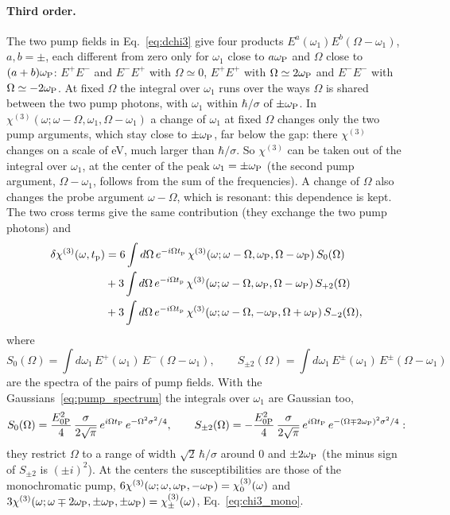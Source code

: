 \documentclass[10pt,a4paper]{paper}
\begin{document}
\paragraph{Third order.} The two pump fields in Eq.~\eqref{eq:dchi3} give four products
$E^a(\omega_1)E^b(\Omega-\omega_1)$, $a,b = \pm$, each different from zero only for $\omega_1$ close to $a\omega_{\mathrm{P}}$ and
$\Omega$ close to $(a+b)\omega_{\mathrm{P}}$: $E^+E^-$ and $E^-E^+$ with $\Omega\simeq0$, $E^+E^+$ with $\Omega\simeq2\omega_{\mathrm{P}}$ and $E^-E^-$
with $\Omega\simeq-2\omega_{\mathrm{P}}$. At fixed $\Omega$ the integral over $\omega_1$ runs over the ways $\Omega$ is shared between
the two pump photons, with $\omega_1$ within $\hbar/\sigma$ of $\pm\omega_{\mathrm{P}}$. In $\chi^{(3)}(\omega;\omega-\Omega,\omega_1,
\Omega-\omega_1)$ a change of $\omega_1$ at fixed $\Omega$ changes only the two pump arguments, which stay close to
$\pm\omega_{\mathrm{P}}$, far below the gap: there $\chi^{(3)}$ changes on a scale of eV, much larger than $\hbar/\sigma$. So $\chi^{(3)}$
can be taken out of the integral over $\omega_1$, at the center of the peak $\omega_1 = \pm\omega_{\mathrm{P}}$ (the second pump
argument, $\Omega-\omega_1$, follows from the sum of the frequencies). A change of $\Omega$ also changes the probe
argument $\omega-\Omega$, which is resonant: this dependence is kept. The two cross terms give the same contribution
(they exchange the two pump photons) and
\begin{align}
\delta\chi^{(3)}(\omega,t_{\mathrm{p}}) &= 6\int d\Omega\,e^{-i\Omega t_{\mathrm{p}}}\,\chi^{(3)}(\omega;\omega-\Omega,\omega_{\mathrm{P}},\Omega-\omega_{\mathrm{P}})\,S_0(\Omega)
\nonumber\\
&+ 3\int d\Omega\,e^{-i\Omega t_{\mathrm{p}}}\,\chi^{(3)}(\omega;\omega-\Omega,\omega_{\mathrm{P}},\Omega-\omega_{\mathrm{P}})\,S_{+2}(\Omega) \nonumber\\
&+ 3\int d\Omega\,e^{-i\Omega t_{\mathrm{p}}}\,\chi^{(3)}(\omega;\omega-\Omega,-\omega_{\mathrm{P}},\Omega+\omega_{\mathrm{P}})\,S_{-2}(\Omega) ,
\label{eq:dchi3_pulse}
\end{align}
where
\begin{equation}
S_0(\Omega) = \int d\omega_1\,E^+(\omega_1)\,E^-(\Omega-\omega_1) , \qquad
S_{\pm2}(\Omega) = \int d\omega_1\,E^\pm(\omega_1)\,E^\pm(\Omega-\omega_1)
\label{eq:S3_def}
\end{equation}
are the spectra of the pairs of pump fields. With the Gaussians~\eqref{eq:pump_spectrum} the integrals over $\omega_1$ are Gaussian too,
\begin{equation}
S_0(\Omega) = \frac{E_{0\mathrm{P}}^2}{4}\,\frac{\sigma}{2\sqrt{\pi}}\,e^{i\Omega t_{\mathrm{P}}}\,e^{-\Omega^2\sigma^2/4} , \qquad
S_{\pm2}(\Omega) = -\frac{E_{0\mathrm{P}}^2}{4}\,\frac{\sigma}{2\sqrt{\pi}}\,e^{i\Omega t_{\mathrm{P}}}\,e^{-(\Omega\mp2\omega_{\mathrm{P}})^2\sigma^2/4} :
\label{eq:S3}
\end{equation}
they restrict $\Omega$ to a range of width $\sqrt{2}\,\hbar/\sigma$ around 0 and $\pm2\omega_{\mathrm{P}}$ (the minus sign of $S_{\pm2}$ is
$(\pm i)^2$). At the centers the susceptibilities are those of the monochromatic pump,
$6\chi^{(3)}(\omega;\omega,\omega_{\mathrm{P}},-\omega_{\mathrm{P}}) = \chi^{(3)}_{0}(\omega)$ and
$3\chi^{(3)}(\omega;\omega\mp2\omega_{\mathrm{P}},\pm\omega_{\mathrm{P}},\pm\omega_{\mathrm{P}}) = \chi^{(3)}_\pm(\omega)$, Eq.~\eqref{eq:chi3_mono}.
\end{document}
